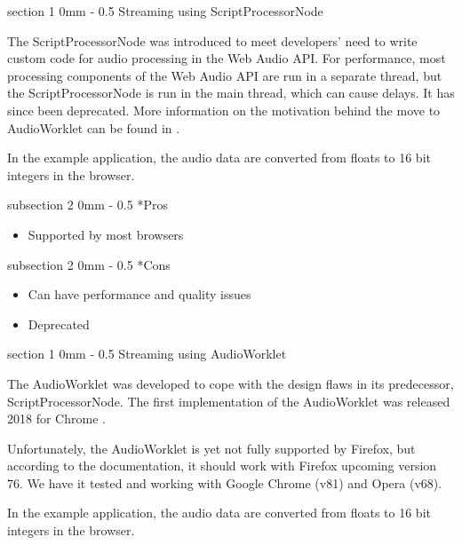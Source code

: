 \documentclass[11pt, a4paper, twoside]{article}
\makeatletter
\renewcommand{\subsection}{\@startsection
  {subsection}%
  {2}%
  {0mm}%
  {-\baselineskip}%
  {0.5\baselineskip}%
  {\bfseries\sffamily\large}}%
\renewcommand{\section}{\@startsection
  {section}%
  {1}%
  {0mm}%
  {-\baselineskip}%
  {0.5\baselineskip}%
  {\bfseries\sffamily\Large}}%
\makeatother
\begin{document}
\section{Streaming using ScriptProcessorNode}

The ScriptProcessorNode\cite{scriptprocessornode} was introduced to meet developers' need to write custom code for audio processing in the Web Audio API. For performance, most processing components of the Web Audio API are run in a separate thread, but the ScriptProcessorNode is run in the main thread, which can cause delays. It has since been deprecated. More information on the motivation behind the move to AudioWorklet can be found in \cite{icmc}.

In the example application, the audio data are converted from floats to 16 bit integers in the browser.

\subsection*{Pros}
\begin{itemize}
\item Supported by most browsers
\end{itemize}

\subsection*{Cons}
\begin{itemize}
\item Can have performance and quality issues
\item Deprecated
\end{itemize}


\section{Streaming using AudioWorklet}

The AudioWorklet was developed to cope with the design flaws in its predecessor, ScriptProcessorNode. The first implementation of the AudioWorklet was released 2018 for Chrome \cite{icmc}.

Unfortunately, the AudioWorklet is yet not fully supported by Firefox, but according to the documentation, it should work with Firefox upcoming version 76. We have it tested and working with Google Chrome (v81) and Opera (v68).

In the example application, the audio data are converted from floats to 16 bit integers in the browser.
\end{document}
